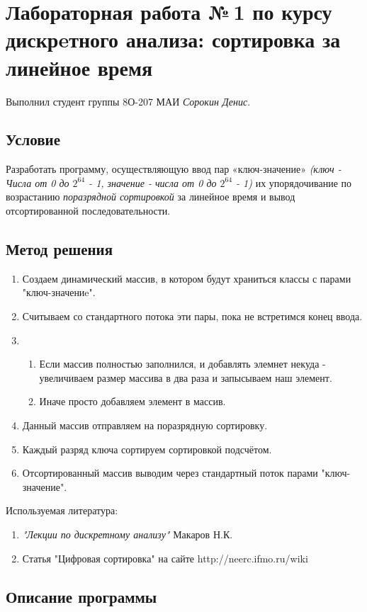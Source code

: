 \documentclass[12pt]{article}
\begin{document}
\section*{Лабораторная работа №\,1 по курсу дискрeтного анализа: сортировка за линейное время}

Выполнил студент группы 8О-207 МАИ \textit{Сорокин Денис}.

\subsection*{Условие}

Разработать программу, осуществляющую ввод пар «ключ-значение» 
\textit{(ключ  - Числа от 0 до $2^{64}$ - 1, значение - числа от 0 до $2^{64}$ - 1)} 
их упорядочивание по возрастанию \textit{поразрядной сортировкой} 
за линейное время и вывод отсортированной последовательности.


\subsection*{Метод решения}
\begin{enumerate}
\item Создаем динамический массив, в котором будут храниться классы с парами "ключ-значениe".
\item Считываем со стандартного потока эти пары, пока не встретимся конец ввода.
\item \begin{enumerate}
	\item Если массив полностью заполнился, и добавлять элемнет некуда - увеличиваем размер массива в два раза и запысываем наш элемент.
	\item Иначе просто добавляем элемент в массив.
\end{enumerate}
\item Данный массив отправляем на поразрядную сортировку.
\item Каждый разряд ключа сортируем сортировкой подсчётом.
\item Отсортированный массив выводим через стандартный поток парами "ключ-значение".
\end{enumerate}
Используемая литература:
\begin{enumerate}
\item \textit{"Лекции по дискретному анализу"} Макаров Н.К.
\item Статья "Цифровая сортировка" на сайте http://neerc.ifmo.ru/wiki
\end{enumerate}
\subsection*{Описание программы}
\end{document}
